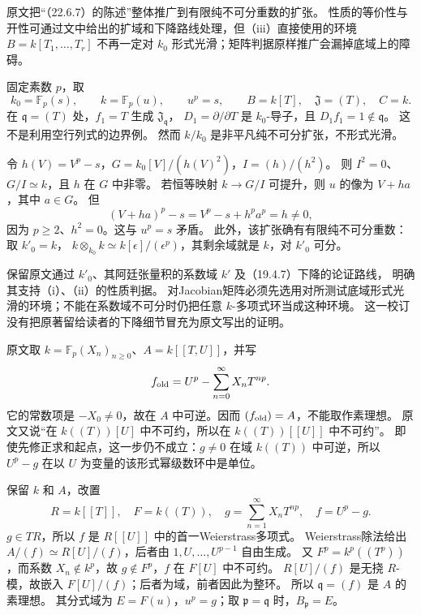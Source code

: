 原文把“（22.6.7）的陈述”整体推广到有限纯不可分重数的扩张。
性质的等价性与开性可通过文中给出的扩域和下降路线处理，但（iii）直接使用的环境
$B=k[T_1,\ldots,T_r]$ 不再一定对 $k_0$ 形式光滑；矩阵判据原样推广会漏掉底域上的障碍。

固定素数 $p$，取
\[
 k_0=\mathbb F_p(s),\qquad k=\mathbb F_p(u),\qquad u^p=s,
 \qquad B=k[T],\quad\mathfrak J=(T),\quad C=k.
\]
在 $\mathfrak q=(T)$ 处，$f_1=T$ 生成 $\mathfrak J_{\mathfrak q}$，
$D_1=\partial/\partial T$ 是 $k_0$-导子，且 $D_1f_1=1\notin\mathfrak q$。
这不是利用空行列式的边界例。
然而 $k/k_0$ 是非平凡纯不可分扩张，不形式光滑。

令 $h(V)=V^p-s$，$G=k_0[V]/(h(V)^2)$，$I=(h)/(h^2)$。
则 $I^2=0$、$G/I\simeq k$，且 $h$ 在 $G$ 中非零。
若恒等映射 $k\to G/I$ 可提升，则 $u$ 的像为 $V+ha$，其中 $a\in G$。
但
\[
 (V+ha)^p-s=V^p-s+h^pa^p=h\ne0,
\]
因为 $p\ge2$、$h^2=0$。这与 $u^p=s$ 矛盾。
此外，该扩张确有有限纯不可分重数：取 $k'_0=k$，
$k\otimes_{k_0}k\simeq k[\epsilon]/(\epsilon^p)$，其剩余域就是 $k$，对 $k'_0$ 可分。

保留原文通过 $k'_0$、其阿廷张量积的系数域 $k'$ 及（19.4.7）下降的论证路线，
明确其支持（i）、（ii）的性质判据。
对Jacobian矩阵必须先选用对所测试底域形式光滑的环境；不能在系数域不可分时仍把任意 $k$-多项式环当成这种环境。
这一校订没有把原著留给读者的下降细节冒充为原文写出的证明。

原文取 $k=\mathbb F_p(X_n)_{n\ge0}$、$A=k[[T,U]]$，并写
\[
 f_{\rm old}=U^p-\sum_{n=0}^{\infty}X_nT^{np}.
\]
它的常数项是 $-X_0\ne0$，故在 $A$ 中可逆。因而 $(f_{\rm old})=A$，不能取作素理想。
原文又说“在 $k((T))[U]$ 中不可约，所以在 $k((T))[[U]]$ 中不可约”。
即使先修正求和起点，这一步仍不成立：$g\ne0$ 在域 $k((T))$ 中可逆，所以 $U^p-g$ 在以 $U$ 为变量的该形式幂级数环中是单位。

保留 $k$ 和 $A$，改置
\[
 R=k[[T]],\quad F=k((T)),\quad
 g=\sum_{n=1}^{\infty}X_nT^{np},\quad f=U^p-g.
\]
$g\in TR$，所以 $f$ 是 $R[[U]]$ 中的首一Weierstrass多项式。
Weierstrass除法给出 $A/(f)\simeq R[U]/(f)$，后者由 $1,U,\ldots,U^{p-1}$ 自由生成。
又 $F^p=k^p((T^p))$，而系数 $X_n\notin k^p$，故 $g\notin F^p$，$f$ 在 $F[U]$ 中不可约。
$R[U]/(f)$ 是无挠 $R$-模，故嵌入 $F[U]/(f)$；后者为域，前者因此为整环。
所以 $\mathfrak q=(f)$ 是 $A$ 的素理想。
其分式域为 $E=F(u)$，$u^p=g$；取 $\mathfrak p=\mathfrak q$ 时，$B_{\mathfrak p}=E$。

